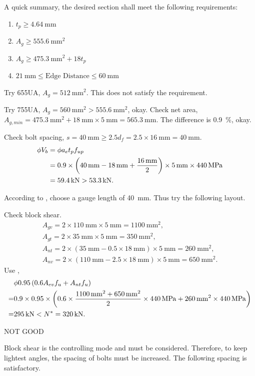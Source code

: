 \begin{solution}
A quick summary, the desired section shall meet the following requirements:
\begin{enumerate}
\item $t_p\geqslant\SI{4.64}{\mm}$
\item $A_g\geqslant\SI{555.6}{\mm^2}$
\item $A_g\geqslant\SI{475.3}{\mm^2}+18t_p$
\item $\SI{21}{\mm}\leqslant\text{Edge Distance}\leqslant\SI{60}{\mm}$
\end{enumerate}

Try 65\texttimes5UA, $A_g=\SI{512}{\mm^2}$. This does not satisfy the requirement.

Try 75\texttimes5UA, $A_g=\SI{560}{\mm^2}>\SI{555.6}{\mm^2}$, okay. Check net area,
$A_{g,min}=\SI{475.3}{\mm^2}+\SI{18}{\mm}\times\SI{5}{\mm}=\SI{565.3}{\mm}$. The difference is \SI{0.9}{\percent}, okay.

Check bolt spacing, $s=\SI{40}{\mm}\geqslant2.5d_f=2.5\times\SI{16}{\mm}=\SI{40}{\mm}$.
\begin{align*}
\phi{}V_b&=\phi{}a_et_pf_{up}\\&=0.9\times\left(\SI{40}{\milli\meter}-\SI{18}{\milli\meter}+\dfrac{\SI{16}{\milli\meter}}{2}\right)\times\SI{5}{\milli\meter}\times\SI{440}{\mega\pascal}\\&=\SI{59.4}{\kilo\newton}>\SI{53.3}{\kilo\newton}.
\end{align*}

According to , choose a gauge length of \SI{40}{\mm}. Thus try the following layout.
\begin{figure}[H]

\end{figure}
Check block shear.
\begin{gather*}
A_{gv}=2\times\SI{110}{\mm}\times\SI{5}{\mm}=\SI{1100}{\mm^2},\\
A_{gt}=2\times\SI{35}{\mm}\times\SI{5}{\mm}=\SI{350}{\mm^2},\\
A_{nt}=2\times\left(\SI{35}{\mm}-0.5\times\SI{18}{\mm}\right)\times\SI{5}{\mm}=\SI{260}{\mm^2},\\
A_{nv}=2\times\left(\SI{110}{\mm}-2.5\times\SI{18}{\mm}\right)\times\SI{5}{\mm}=\SI{650}{\mm^2}.
\end{gather*}
Use ,
\begin{align*}
&\phi0.95\left(0.6A_{ev}f_u+A_{nt}f_u\right)\\
=&0.9\times0.95\times\left(0.6\times\dfrac{\SI{1100}{\milli\meter^2}+\SI{650}{\milli\meter^2}}{2}\times\SI{440}{\mega\pascal}+\SI{260}{\milli\meter^2}\times\SI{440}{\mega\pascal}\right)\\
=&\SI{295}{\kilo\newton}<N^*=\SI{320}{\kilo\newton}.
\end{align*}
\begin{flushright}
NOT GOOD
\end{flushright}
Block shear is the controlling mode and must be considered. Therefore, to keep lightest angles, the spacing of bolts must be increased. The following spacing is satisfactory.
\begin{figure}[H]

\end{figure}
\end{solution}
